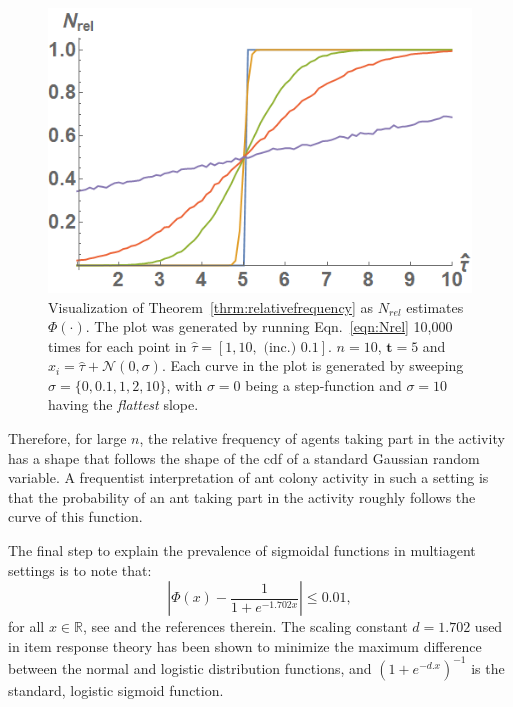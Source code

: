 \documentclass[conference]{ieeeconf}
\def\R{\mathbb{R}}
\newcommand{\td}{\mathbf{t}}
\begin{document}
\begin{figure}[!tb]
	\centering\includegraphics[width=\columnwidth]{../figures/thm2fig.png}
	\centering\caption{Visualization of Theorem~\ref{thrm:relativefrequency} as $N_{rel}$ estimates $\Phi(\cdot)$. The plot was generated by running Eqn.~\ref{eqn:Nrel} 10,000 times for each point in $\hat{\tau} = [1,10,\text{ (inc.) }0.1]$. $n = 10$, $\td = 5$ and $x_i = \hat{\tau} + \mathcal{N}(0, \sigma)$. Each curve in the plot is generated by sweeping $\sigma = \{0, 0.1, 1, 2, 10\}$, with $\sigma = 0$ being a step-function and $\sigma = 10$ having the \emph{flattest} slope.}\label{fig:thm2fig}
\end{figure}

Therefore, for large $n$, the relative frequency of agents taking part in the activity has a shape that follows the shape of the cdf of a standard Gaussian random variable. A frequentist interpretation of ant colony activity in such a setting is that the probability of an ant taking part in the activity roughly follows the curve of this function. 

The final step to explain the prevalence of sigmoidal functions in multiagent settings is to note that:
\begin{equation}
|\Phi(x)-\frac{1}{1+e^{-1.702x}}|\leq 0.01,
\end{equation}
for all $x\in\R$, see \cite{camilli1994} and the references therein. The scaling constant $d = 1.702$ used in item response theory has been shown to minimize the
maximum difference between the normal and logistic distribution functions, and $(1+e^{-d.x})^{-1}$ is the standard, logistic sigmoid function. 
\end{document}
